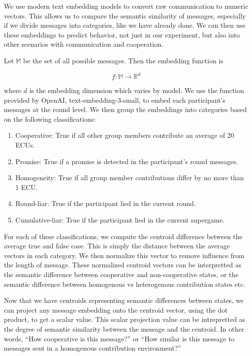 \documentclass[12pt,letterpaper,english]{article}
\begin{document}
We use modern text embedding models to convert raw communication to numeric vectors.
This allows us to compare the semantic similarity of messages, especially if we divide messages
into categories, like we have already done. We can then use these embeddings to predict behavior, not
just in our experiment, but also into other scenarios with communication and cooperation.

Let $\mathbb{M}$ be the set of all possible messages. Then the embedding function is

\begin{equation}
    f: \mathbb{M} \rightarrow \mathbb{R}^d
\end{equation}

where $d$ is the embedding dimension which varies by model. We use the function provided by 
OpenAI, text-embedding-3-small, to embed
each participant's messages at the round level. We then group the embeddings into categories
based on the following classifications:

\begin{enumerate}
    \item Cooperative: True if all other group members contribute an average of 20 ECUs.
    \item Promise: True if a promise is detected in the participant's round messages.
    \item Homogeneity: True if all group member contributions differ by no more than 1 ECU.
    \item Round-liar: True if the participant lied in the current round.
    \item Cumulative-liar: True if the participant lied in the current supergame.
\end{enumerate}

For each of these classifications, we compute the centroid difference between the average true and false case.
This is simply the distance between the average vectors in each category. We then normalize this vector to remove
influence from the length of message. These normalized centroid vectors can be interpretted as the semantic difference
between cooperative and non-cooperative states, or the semantic difference between homogenous vs heterogenous contribution states etc. 

Now that we have centroids representing semantic differences between states, we can project any message embedding onto the centroid
vector, using the dot product, to get a scalar value. This scalar projection value can be intrepretted as the degree of semantic
similarity between the message and the centroid. In other words, ``How cooperative is this message?'' or ``How similar is this message to
messages sent in a homogenous contribution environment?''
\end{document}
